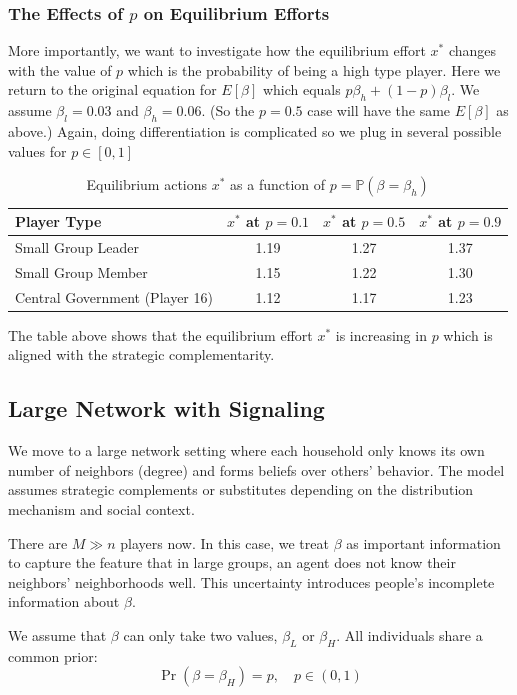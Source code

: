 \documentclass[12pt]{article}
\begin{document}
\subsubsection*{The Effects of $p$ on Equilibrium Efforts}
More importantly, we want to investigate how the equilibrium effort \( x^* \) changes with the value of \( p \) which is the probability of being a high type player. Here we return to the original equation for $E[\beta]$ which equals $p\beta_h+(1-p)\beta_l$. We assume $\beta_l=0.03$ and $\beta_h=0.06$. (So the $p=0.5$ case will have the same $E[\beta]$ as above.)  Again, doing differentiation is complicated so we plug in several possible values for $p \in [0,1]$\\
\begin{table}[H]
  \centering
  \begin{tabular}{lccc}
  \toprule
  \textbf{Player Type} & \textbf{\( x^* \) at \( p = 0.1 \)} & \textbf{\( x^* \) at \( p = 0.5 \)} & \textbf{\( x^* \) at \( p = 0.9 \)} \\
  \midrule
  Small Group Leader        & 1.19 & 1.27 & 1.37 \\
  Small Group Member        & 1.15 & 1.22 & 1.30 \\
  Central Government (Player 16) & 1.12 & 1.17 & 1.23 \\
  \bottomrule
  \end{tabular}
  \caption{Equilibrium actions \( x^* \) as a function of \( p = \mathbb{P}(\beta = \beta_h) \)}
  \label{tab:xstar-vs-p}
  \end{table}
The table above shows that the equilibrium effort \( x^* \) is increasing in \( p \) which is aligned with the strategic complementarity.\\  
\subsection{Large Network with Signaling}
We move to a large network setting where each household only knows its own number of neighbors (degree) and forms beliefs over others' behavior. The model assumes strategic complements or substitutes depending on the distribution mechanism and social context.

There are $M \gg n$ players now. In this case, we treat $\beta$ as important information to capture the feature that in large groups, an agent does not know their neighbors' neighborhoods well.  
This uncertainty introduces people's incomplete information about $\beta$.

We assume that $\beta$ can only take two values, $\beta_L$ or $\beta_H$.  
All individuals share a common prior:
\[
\Pr(\beta = \beta_H) = p, \quad p \in (0,1)
\]
\end{document}
